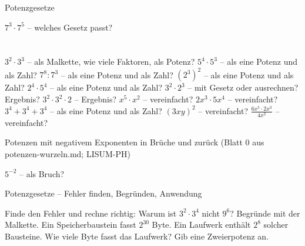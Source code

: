 \setcounter{aufgabe}{13}

\begin{aufgabe}{Potenzgesetze}
\begin{teile}
\teil $7^3 \cdot 7^5$ – welches Gesetz passt? \\  \\  \\ 
\teil $3^2 \cdot 3^3$ – als Malkette, wie viele Faktoren, als Potenz? \leerfeld
\teil $5^4 \cdot 5^3$ – als eine Potenz und als Zahl? \leerfeld
\teil $7^8 : 7^3$ – als eine Potenz und als Zahl? \leerfeld
\teil $(2^3)^2$ – als eine Potenz und als Zahl? \leerfeld
\teil $2^4 \cdot 5^4$ – als eine Potenz und als Zahl? \leerfeld
\teil $3^2 \cdot 2^3$ – mit Gesetz oder ausrechnen? Ergebnis? \leerfeld
\teil $3^2 \cdot 3^2 \cdot 2$ – Ergebnis? \leerfeld
\teil $x^5 \cdot x^2$ – vereinfacht? \leerfeld
\teil $2x^3 \cdot 5x^4$ – vereinfacht? \leerfeld
\teil $3^4 + 3^4 + 3^4$ – als eine Potenz und als Zahl? \leerfeld
\teil $(3xy)^2$ – vereinfacht? \leerfeld
\teil $\frac{6x^5 \cdot 2x^3}{4x^2}$ – vereinfacht? \leerfeld
\end{teile}
\end{aufgabe}

\begin{aufgabe}{Potenzen mit negativem Exponenten in Brüche und zurück (Blatt 0 aus potenzen-wurzeln.md; LISUM-PH)}
\begin{teile}
\teil $5^{-2}$ – als Bruch? \leerfeld
\end{teile}
\end{aufgabe}

\begin{aufgabe}{Potenzgesetze – Fehler finden, Begründen, Anwendung}
\begin{teile}
\teil Finde den Fehler und rechne richtig: 
\teil Warum ist $3^2 \cdot 3^4$ nicht $9^6$? Begründe mit der Malkette.
\teil Ein Speicherbaustein fasst $2^{30}$ Byte. Ein Laufwerk enthält $2^8$ solcher Bausteine. Wie viele Byte fasst das Laufwerk? Gib eine Zweierpotenz an.
\end{teile}
\end{aufgabe}
